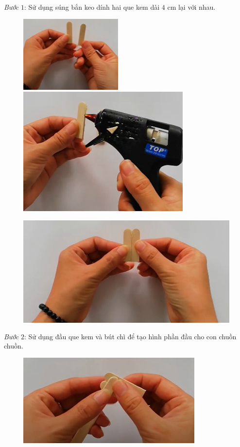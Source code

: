 \begin{multicols}{2}
	\vskip 0.1cm
	\textit{Bước} $1$: Sử dụng súng bắn keo dính hai que kem dài $4$ cm lại với nhau.
	\begin{figure}[H]
		\vspace*{-5pt}
		\centering
		\captionsetup{labelformat= empty, justification=centering}
		\includegraphics[height=0.37\linewidth]{11}
		\includegraphics[height=0.37\linewidth]{12}
		
		\vspace*{1pt}
		\includegraphics[width=1\linewidth]{13}
	\end{figure}
	\textit{Bước} $2$: Sử dụng đầu que kem và bút chì để tạo hình phần đầu cho con chuồn chuồn.
	\begin{figure}[H]
		\vspace*{-5pt}
		\centering
		\captionsetup{labelformat= empty, justification=centering}
		\includegraphics[width=0.7\linewidth]{14}
		

\end{figure}
\end{multicols}
